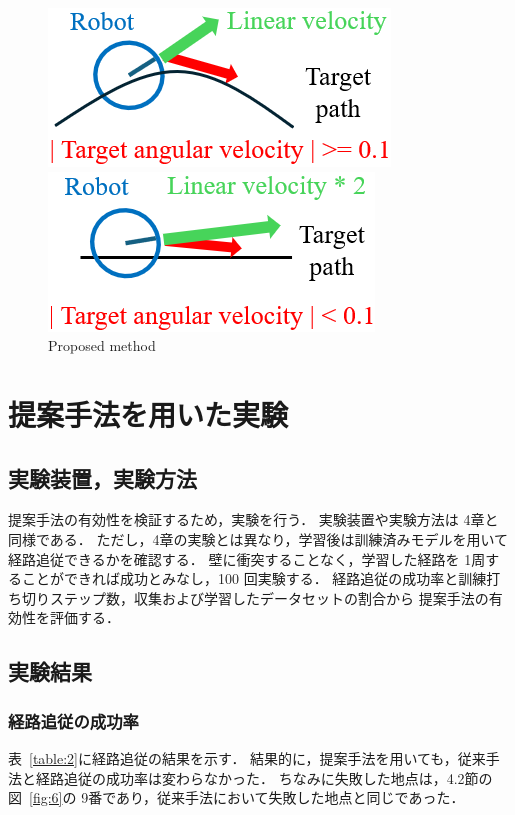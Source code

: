 \documentclass{jarticle}
\renewcommand{\figurename}{図~}
\renewcommand{\tablename}{表~}
\newcommand{\figref}[1]{\figurename\ref{#1}}
\newcommand{\tabref}[1]{\tablename\ref{#1}}
\begin{document}
\begin{figure}[htbp]
  \begin{minipage}[t]{0.5\linewidth}
    \centering
    \includegraphics[keepaspectratio, scale=0.34]{./png/a2.png}
  \end{minipage}
  \begin{minipage}[t]{0.5\linewidth}
    \centering
    \includegraphics[keepaspectratio, scale=0.34]{./png/b.png}
  \end{minipage}
  \caption{Proposed method}
  \label{fig:10}
\end{figure}


\section{提案手法を用いた実験}

\subsection{実験装置，実験方法}
提案手法の有効性を検証するため，実験を行う．
実験装置や実験方法は 4章と同様である．
ただし，4章の実験とは異なり，学習後は訓練済みモデルを用いて経路追従できるかを確認する．
壁に衝突することなく，学習した経路を 1周することができれば成功とみなし，100 回実験する．
経路追従の成功率と訓練打ち切りステップ数，収集および学習したデータセットの割合から
提案手法の有効性を評価する．

\subsection{実験結果}
\subsubsection{経路追従の成功率}
\tabref{table:2}に経路追従の結果を示す．
結果的に，提案手法を用いても，従来手法と経路追従の成功率は変わらなかった．
ちなみに失敗した地点は，4.2節の\figref{fig:6}の 9番であり，従来手法において失敗した地点と同じであった．
\end{document}

